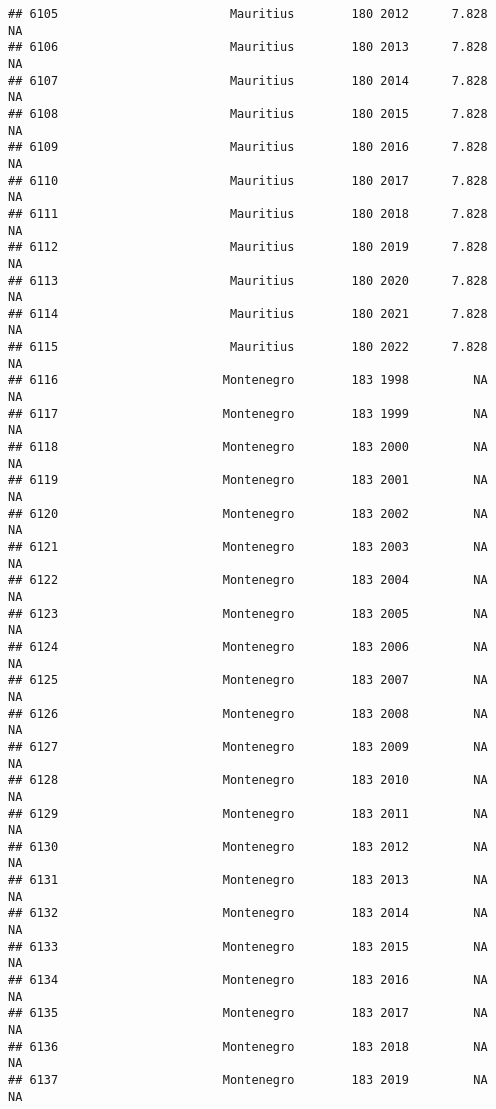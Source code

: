 \documentclass[
]{article}
\begin{document}
\begin{verbatim}
## 6105                        Mauritius        180 2012      7.828         NA
## 6106                        Mauritius        180 2013      7.828         NA
## 6107                        Mauritius        180 2014      7.828         NA
## 6108                        Mauritius        180 2015      7.828         NA
## 6109                        Mauritius        180 2016      7.828         NA
## 6110                        Mauritius        180 2017      7.828         NA
## 6111                        Mauritius        180 2018      7.828         NA
## 6112                        Mauritius        180 2019      7.828         NA
## 6113                        Mauritius        180 2020      7.828         NA
## 6114                        Mauritius        180 2021      7.828         NA
## 6115                        Mauritius        180 2022      7.828         NA
## 6116                       Montenegro        183 1998         NA         NA
## 6117                       Montenegro        183 1999         NA         NA
## 6118                       Montenegro        183 2000         NA         NA
## 6119                       Montenegro        183 2001         NA         NA
## 6120                       Montenegro        183 2002         NA         NA
## 6121                       Montenegro        183 2003         NA         NA
## 6122                       Montenegro        183 2004         NA         NA
## 6123                       Montenegro        183 2005         NA         NA
## 6124                       Montenegro        183 2006         NA         NA
## 6125                       Montenegro        183 2007         NA         NA
## 6126                       Montenegro        183 2008         NA         NA
## 6127                       Montenegro        183 2009         NA         NA
## 6128                       Montenegro        183 2010         NA         NA
## 6129                       Montenegro        183 2011         NA         NA
## 6130                       Montenegro        183 2012         NA         NA
## 6131                       Montenegro        183 2013         NA         NA
## 6132                       Montenegro        183 2014         NA         NA
## 6133                       Montenegro        183 2015         NA         NA
## 6134                       Montenegro        183 2016         NA         NA
## 6135                       Montenegro        183 2017         NA         NA
## 6136                       Montenegro        183 2018         NA         NA
## 6137                       Montenegro        183 2019         NA         NA

\end{verbatim}
\end{document}
